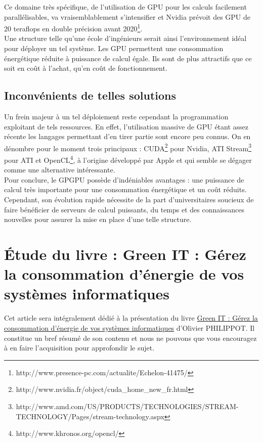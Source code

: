 \documentclass[a4paper,11pt,french]{article}
\begin{document}
Ce domaine très spécifique, de l'utilisation de GPU pour les calculs facilement parallélisables, va vraisemblablement s’intensifier et Nvidia prévoit des GPU de 20 teraflops en double précision avant 2020\footnote{\textsf{http://www.presence-pc.com/actualite/Echelon-41475/}}.\\

Une structure telle qu’une école d’ingénieurs serait ainsi l’environnement idéal pour déployer un tel système. Les GPU permettent une consommation énergétique réduite à puissance de calcul égale. Ils sont de plus attractifs que ce soit en coût à l’achat, qu’en coût de fonctionnement.\\

\subsection{Inconvénients de telles solutions}
Un frein majeur à un tel déploiement reste cependant la programmation exploitant de tels ressources. En effet, l'utilisation massive de GPU étant assez récente les langages permettant d'en tirer partie sont encore peu connus. On en dénombre pour le moment trois principaux : CUDA\footnote{\textsf{http://www.nvidia.fr/object/cuda\_{}home\_{}new\_{}fr.html}} pour Nvidia, ATI Stream\footnote{\textsf{http://www.amd.com/US/PRODUCTS/TECHNOLOGIES/STREAM-TECHNOLOGY/Pages/stream-technology.aspx}} pour ATI et OpenCL\footnote{\textsf{http://www.khronos.org/opencl/}}, à l'origine développé par Apple et qui semble se dégager comme une alternative intéressante.\\

Pour conclure, le GPGPU possède d'indéniables avantages : une puissance de calcul très importante pour une consommation énergétique et un coût réduits. Cependant, son évolution rapide nécessite de la part d'universitaires soucieux de faire bénéficier de serveurs de calcul puissants, du temps et des connaissances nouvelles pour assurer la mise en place d'une telle structure.\\




\section[\'Etude d'un livre]{\'Etude du livre : \og Green IT : Gérez la consommation d'énergie de vos systèmes informatiques \fg}

Cet article sera intégralement dédié à la présentation du livre \underline{Green IT : Gérez la consommation d'énergie de vos systèmes informatiques} d’Olivier PHILIPPOT. Il constitue un bref résumé de son contenu et nous ne pouvons que vous encouragez à en faire l’acquisition pour approfondir le sujet.\\
\end{document}

